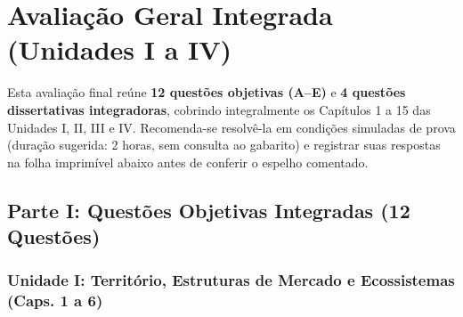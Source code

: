 
\cleardoublepage
{}
{}
\chapter*{Avaliação Geral Integrada (Unidades I a IV)}

Esta avaliação final reúne \textbf{12 questões objetivas (A--E)} e \textbf{4 questões dissertativas integradoras}, cobrindo integralmente os Capítulos 1 a 15 das Unidades I, II, III e IV. Recomenda-se resolvê-la em condições simuladas de prova (duração sugerida: 2 horas, sem consulta ao gabarito) e registrar suas respostas na folha imprimível abaixo antes de conferir o espelho comentado.

\section*{Parte I: Questões Objetivas Integradas (12 Questões)}

\subsection*{Unidade I: Território, Estruturas de Mercado e Ecossistemas (Caps. 1 a 6)}

